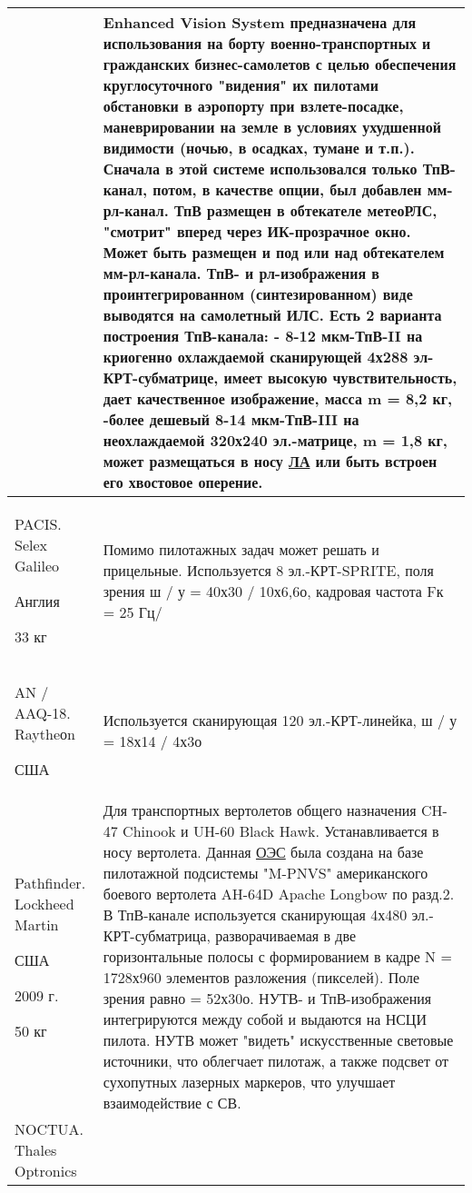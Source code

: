 \begin{landscape}
\begin{longtable}{| p{6cm} | p{18cm} |}
& 
Enhanced Vision System предназначена для использования на борту военно-транспортных и гражданских бизнес-самолетов с целью обеспечения круглосуточного "видения" их пилотами обстановки в аэропорту при взлете-посадке, маневрировании на земле в условиях ухудшенной видимости (ночью, в осадках, тумане и т.п.). 
Сначала в этой системе использовался только ТпВ-канал, потом, в качестве опции, был добавлен мм-рл-канал. ТпВ размещен в обтекателе метеоРЛС, "смотрит" вперед через ИК-прозрачное окно. Может быть размещен и под или над обтекателем мм-рл-канала. ТпВ- и рл-изображения в проинтегрированном (синтезированном) виде выводятся на самолетный ИЛС. Есть 2 варианта построения ТпВ-канала: - 8-12 мкм-ТпВ-II на криогенно охлаждаемой сканирующей 4х288 эл-КРТ-субматрице, имеет высокую чувствительность, дает качественное изображение, масса m = 8,2 кг, 
-более дешевый 8-14 мкм-ТпВ-III на неохлаждаемой 320х240 эл.-матрице, m = 1,8 кг, может размещаться в носу  \hyperref[acroLA]{ЛА} или быть встроен его хвостовое оперение.
 
\\ \hline
		PACIS. Selex Galileo
		
		Англия		
		
		33 кг 
& 
Помимо пилотажных задач может решать и прицельные. Используется 8 эл.-КРТ-SPRITE, поля зрения ш / у = 40х30 / 10х6,6о, кадровая частота Fк = 25 Гц/ 
\\ \hline
	AN / AAQ-18. Raytheоn	
	
	США		 
& 
Используется сканирующая 120 эл.-КРТ-линейка, ш / у = 18х14 / 4х3о 
\\ \hline
	Pathfinder. Lockheed Martin	
	
	США	
	
	2009 г.	
	
	50 кг 
& 
Для транспортных вертолетов общего назначения CH-47 Chinook и UH-60 Black Hawk. Устанавливается в носу вертолета.
Данная  \hyperref[acroEOS]{ОЭС} была создана на базе пилотажной подсистемы "M-PNVS" американского боевого вертолета AH-64D Apache Longbow по разд.2. В ТпВ-канале используется сканирующая 4х480 эл.-КРТ-субматрица, разворачиваемая в две горизонтальные полосы с формированием в кадре N = 1728х960 элементов разложения (пикселей). Поле зрения равно = 52х30о. НУТВ- и ТпВ-изображения интегрируются между собой и выдаются на НСЦИ пилота. НУТВ может "видеть" искусственные световые источники, что облегчает пилотаж, а также подсвет от сухопутных лазерных маркеров, что улучшает взаимодействие с СВ. 
 
\\ \hline
	NOCTUA. Thales Optronics	
	

\end{longtable}
\end{landscape}
